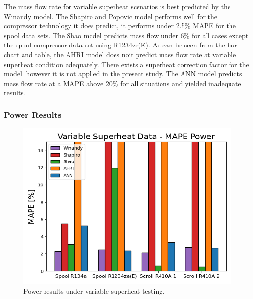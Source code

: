 \documentclass[preprint,11pt,authoryear]{elsarticle}
\begin{document}
\begin{table}[h]
\caption{Mass flow rate results for variable superheat scenarios.}
\label{Tab:data_info}
\begin{center}
\end{center}
\end{table}

The mass flow rate for variable superheat scenarios is best predicted by the Winandy model. The Shapiro and Popovic model performs well for the compressor technology it does predict, it performs under 2.5\% MAPE for the spool data sets. The Shao model predicts mass flow under 6\% for all cases except the spool compressor data set using R1234ze(E). As can be seen from the bar chart and table, the AHRI model does noit predict mass flow rate at variable superheat condition adequately. There exists a superheat correction factor for the model, however it is not applied in the present study. The ANN model predicts mass flow rate at a MAPE above 20\% for all situations and yielded inadequate results.  

\subsubsection{Power Results}
\begin{figure}
\centering
\includegraphics[width=0.7\linewidth]{power_vspr.png}
\caption{Power results under variable superheat testing.}
\label{fig:power_vspd}
\end{figure}
\FloatBarrier
\end{document}
